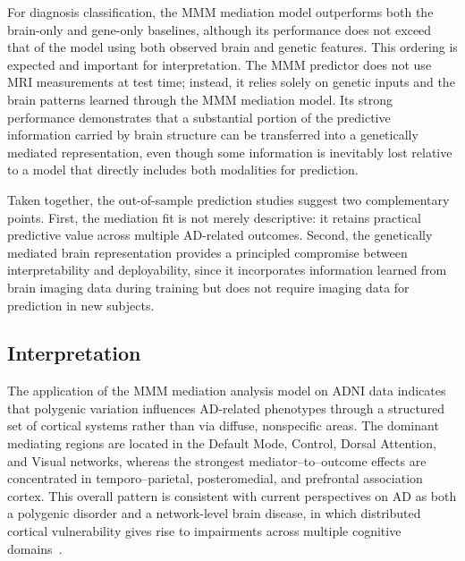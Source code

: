 \documentclass[
  12pt]{article}
\begin{document}
For diagnosis classification, the MMM mediation model outperforms both the brain-only and gene-only baselines, although its performance does not exceed that of the model using both observed brain and genetic features.
This ordering is expected and important for interpretation.
The MMM predictor does not use MRI measurements at test time; instead, it relies solely on genetic inputs and the brain patterns learned through the MMM mediation model.
Its strong performance demonstrates that a substantial portion of the predictive information carried by brain structure can be transferred into a genetically mediated representation, even though some information is inevitably lost relative to a model that directly includes both modalities for prediction.

Taken together, the out-of-sample prediction studies suggest two complementary points.
First, the mediation fit is not merely descriptive: it retains practical predictive value across multiple AD-related outcomes.
Second, the genetically mediated brain representation provides a principled compromise between interpretability and deployability, since it incorporates information learned from brain imaging data during training but does not require imaging data for prediction in new subjects.

\subsection{Interpretation}
The application of the MMM mediation analysis model on ADNI data indicates that polygenic variation influences AD-related phenotypes through a structured set of cortical systems rather than via diffuse, nonspecific areas.
The dominant mediating regions are located in the Default Mode, Control, Dorsal Attention, and Visual networks, whereas the strongest mediator--to--outcome effects are concentrated in temporo--parietal, posteromedial, and prefrontal association cortex.
This overall pattern is consistent with current perspectives on AD as both a polygenic disorder and a network-level brain disease, in which distributed cortical vulnerability gives rise to impairments across multiple cognitive domains~\citep{grasby2020genetic,mohan2016significance,tang2024multimodal, Diaz2025OPTIMUS}.

\end{document}

